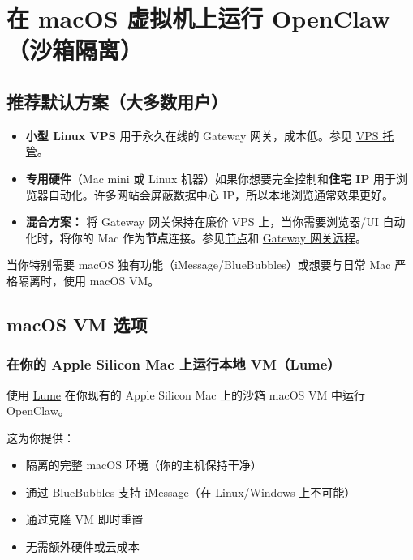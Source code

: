\clearpage

\section{在 macOS 虚拟机上运行 OpenClaw（沙箱隔离）}


\subsection{推荐默认方案（大多数用户）}


\begin{itemize}
  \item \textbf{小型 Linux VPS} 用于永久在线的 Gateway 网关，成本低。参见 \href{/vps}{VPS 托管}。
  \item \textbf{专用硬件}（Mac mini 或 Linux 机器）如果你想要完全控制和\textbf{住宅 IP} 用于浏览器自动化。许多网站会屏蔽数据中心 IP，所以本地浏览通常效果更好。
  \item \textbf{混合方案：} 将 Gateway 网关保持在廉价 VPS 上，当你需要浏览器/UI 自动化时，将你的 Mac 作为\textbf{节点}连接。参见\href{/nodes}{节点}和 \href{/gateway/remote}{Gateway 网关远程}。
\end{itemize}


当你特别需要 macOS 独有功能（iMessage/BlueBubbles）或想要与日常 Mac 严格隔离时，使用 macOS VM。

\subsection{macOS VM 选项}


\subsubsection{在你的 Apple Silicon Mac 上运行本地 VM（Lume）}


使用 \href{https://cua.ai/docs/lume}{Lume} 在你现有的 Apple Silicon Mac 上的沙箱 macOS VM 中运行 OpenClaw。

这为你提供：

\begin{itemize}
  \item 隔离的完整 macOS 环境（你的主机保持干净）
  \item 通过 BlueBubbles 支持 iMessage（在 Linux/Windows 上不可能）
  \item 通过克隆 VM 即时重置
  \item 无需额外硬件或云成本
\end{itemize}


